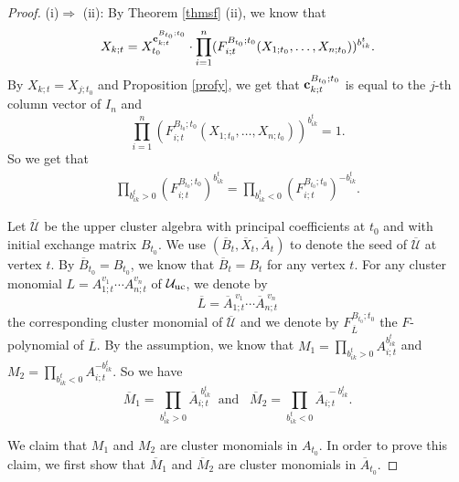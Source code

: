 \documentclass{amsart}
\theoremstyle{definition}
\theoremstyle{remark}
\numberwithin{equation}{section}
\begin{document}
\begin{proof}
(i)$\Longrightarrow$ (ii):
By Theorem \ref{thmsf} (ii), we know that $$X_{k;t}=X_{t_0}^{{\bf c}_{k;t}^{B_{t_0};t_0}}\cdot \prod\limits_{i=1}^n(F_{i;t}^{B_{t_0};t_0}(X_{1;t_0},\ldots,X_{n;t_0}))^{b_{ik}^t}.$$
By $X_{k;t}=X_{j;t_0}$ and Proposition \ref{profy}, we get that ${\bf c}_{k;t}^{B_{t_0};t_0}$ is equal to the $j$-th column vector of $I_n$ and
$$\prod\limits_{i=1}^n(F_{i;t}^{B_{t_0};t_0}(X_{1;t_0},\ldots,X_{n;t_0}))^{b_{ik}^t}=1.$$
So we get that
\begin{eqnarray}\label{eqnfequal1}
\prod\limits_{b_{ik}^t>0}(F_{i;t}^{B_{t_0};t_0})^{b_{ik}^t}=
\prod\limits_{b_{ik}^t<0}(F_{i;t}^{B_{t_0};t_0})^{-b_{ik}^t}.
\end{eqnarray}



Let $\overline{\mathcal U}$ be the  upper cluster algebra with principal coefficients at $t_0$ and with initial exchange matrix $B_{t_0}$. We use $(\overline B_t,\overline X_t,\overline A_t)$ to denote the seed of $\overline{\mathcal U}$ at vertex $t$. By $\overline B_{t_0}=B_{t_0}$, we know that $\overline B_t=B_t$ for any vertex $t$. For any cluster monomial $L=A_{1;t}^{v_1}\cdots A_{n;t}^{v_n}$ of $\mathcal U_{\rm uc}$, we denote by $$\overline L=\overline A_{1;t}^{\;v_1}\cdots \overline A_{n;t}^{\;v_n}$$ the corresponding cluster monomial of $\overline{\mathcal U}$ and we denote by $F_{\overline L}^{B_{t_0};t_0}$ the $F$-polynomial of $\overline L$. By the assumption, we know that  $M_1=\prod\limits_{b_{ik}^t>0}A_{i;t}^{b_{ik}^t}$ and $M_2=\prod\limits_{b_{ik}^t<0}A_{i;t}^{-b_{ik}^t}$.
So we have $$\overline M_1=\prod\limits_{b_{ik}^t>0}\overline A_{i;t}^{\;b_{ik}^t}\;\;\text{and}\;\;\;\overline M_2=\prod\limits_{b_{ik}^t<0}\overline A_{i;t}^{\;-b_{ik}^t}.$$


We claim that  $M_1$ and $M_2$ are cluster monomials in $A_{t_0}$. In order to prove this claim, we first show that  $\overline M_1$ and $\overline M_2$ are cluster monomials in $\overline A_{t_0}$.




\end{proof}
\end{document}
